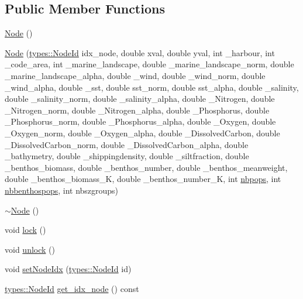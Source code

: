 \subsection*{Public Member Functions}
\begin{DoxyCompactItemize}
\item 
\mbox{\hyperlink{class_node_ad7a34779cad45d997bfd6d3d8043c75f}{Node}} ()
\item 
\mbox{\hyperlink{class_node_a2f4945a1768bf4b7470d5e63028265b2}{Node}} (\mbox{\hyperlink{classtypes_1_1_node_id}{types\+::\+Node\+Id}} idx\+\_\+node, double xval, double yval, int \+\_\+harbour, int \+\_\+code\+\_\+area, int \+\_\+marine\+\_\+landscape, double \+\_\+marine\+\_\+landscape\+\_\+norm, double \+\_\+marine\+\_\+landscape\+\_\+alpha, double \+\_\+wind, double \+\_\+wind\+\_\+norm, double \+\_\+wind\+\_\+alpha, double \+\_\+sst, double sst\+\_\+norm, double sst\+\_\+alpha, double \+\_\+salinity, double \+\_\+salinity\+\_\+norm, double \+\_\+salinity\+\_\+alpha, double \+\_\+\+Nitrogen, double \+\_\+\+Nitrogen\+\_\+norm, double \+\_\+\+Nitrogen\+\_\+alpha, double \+\_\+\+Phosphorus, double \+\_\+\+Phosphorus\+\_\+norm, double \+\_\+\+Phosphorus\+\_\+alpha, double \+\_\+\+Oxygen, double \+\_\+\+Oxygen\+\_\+norm, double \+\_\+\+Oxygen\+\_\+alpha, double \+\_\+\+Dissolved\+Carbon, double \+\_\+\+Dissolved\+Carbon\+\_\+norm, double \+\_\+\+Dissolved\+Carbon\+\_\+alpha, double \+\_\+bathymetry, double \+\_\+shippingdensity, double \+\_\+siltfraction, double \+\_\+benthos\+\_\+biomass, double \+\_\+benthos\+\_\+number, double \+\_\+benthos\+\_\+meanweight, double \+\_\+benthos\+\_\+biomass\+\_\+K, double \+\_\+benthos\+\_\+number\+\_\+K, int \mbox{\hyperlink{thread__vessels_8cpp_a664e1cfcbba8af93cd65eaeb74e3b3a5}{nbpops}}, int \mbox{\hyperlink{simulator_2main_8cpp_a18da12a1dce03dc746278b124588e10e}{nbbenthospops}}, int nbszgroups)
\item 
\mbox{\hyperlink{class_node_aa0840c3cb5c7159be6d992adecd2097c}{$\sim$\+Node}} ()
\item 
void \mbox{\hyperlink{class_node_ad31d57f72ea132348b73b13399c0f243}{lock}} ()
\item 
void \mbox{\hyperlink{class_node_a4123708bb2755ae24fa5e120a8f028b6}{unlock}} ()
\item 
void \mbox{\hyperlink{class_node_a1469600e42997b286d197177e6f81fd8}{set\+Node\+Idx}} (\mbox{\hyperlink{classtypes_1_1_node_id}{types\+::\+Node\+Id}} id)
\item 
\mbox{\hyperlink{classtypes_1_1_node_id}{types\+::\+Node\+Id}} \mbox{\hyperlink{class_node_abc4143a5efe9b5b1cc6dfaf4069ee29f}{get\+\_\+idx\+\_\+node}} () const

\end{DoxyCompactItemize}
